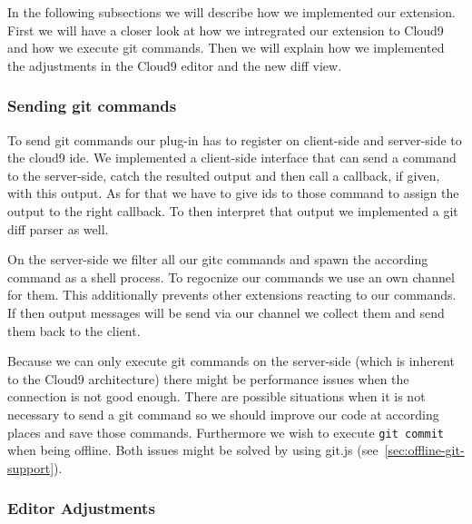 In the following subsections we will describe how we implemented our extension.
First we will have a closer look at how we intregrated our extension to Cloud9 and how we execute git commands.
Then we will explain how we implemented the adjustments in the Cloud9 editor and the new diff view.

\subsubsection{Sending git commands}

To send git commands our plug-in has to register on client-side and server-side to the cloud9 ide.
We implemented a client-side interface that can send a command to the server-side, catch the resulted output and then call a callback, if given, with this output.
As for that we have to give ids to those command to assign the output to the right callback.
To then interpret that output we implemented a git diff parser as well. 

On the server-side we filter all our gitc commands and spawn the according command as a shell process.
To regocnize our commands we use an own channel for them.
This additionally prevents other extensions reacting to our commands.
If then output messages will be send via our channel we collect them and send them back to the client.

Because we can only execute git commands on the server-side (which is inherent to the Cloud9 architecture) there might be performance issues when the connection is not good enough.
There are possible situations when it is not necessary to send a git command so we should improve our code at according places and save those commands.
Furthermore we wish to execute \texttt{git commit} when being offline.
Both issues might be solved by using git.js (see~\ref{sec:offline-git-support}).

\subsubsection{Editor Adjustments}

